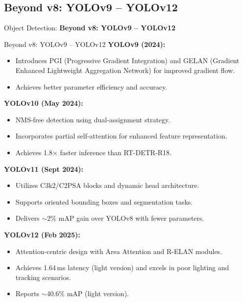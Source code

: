 \subsection{Beyond v8: YOLOv9 – YOLOv12}
\begin{frame}{}
    \LARGE Object Detection: \textbf{Beyond v8: YOLOv9 – YOLOv12}
\end{frame}

\begin{frame}[allowframebreaks]{Beyond v8: YOLOv9 – YOLOv12}
    \textbf{YOLOv9 (2024):}
    \begin{itemize}
        \item Introduces PGI (Progressive Gradient Integration) and GELAN (Gradient Enhanced Lightweight Aggregation Network) for improved gradient flow.
        \item Achieves better parameter efficiency and accuracy.
    \end{itemize}

    \textbf{YOLOv10 (May 2024):}
    \begin{itemize}
        \item NMS-free detection using dual-assignment strategy.
        \item Incorporates partial self-attention for enhanced feature representation.
        \item Achieves 1.8$\times$ faster inference than RT-DETR-R18.
    \end{itemize}

    \textbf{YOLOv11 (Sept 2024):}
    \begin{itemize}
        \item Utilizes C3k2/C2PSA blocks and dynamic head architecture.
        \item Supports oriented bounding boxes and segmentation tasks.
        \item Delivers $\sim$2\% mAP gain over YOLOv8 with fewer parameters.
    \end{itemize}

    \textbf{YOLOv12 (Feb 2025):}
    \begin{itemize}
        \item Attention-centric design with Area Attention and R-ELAN modules.
        \item Achieves 1.64\,ms latency (light version) and excels in poor lighting and tracking scenarios.
        \item Reports $\sim$40.6\% mAP (light version).
    \end{itemize}
\end{frame}
